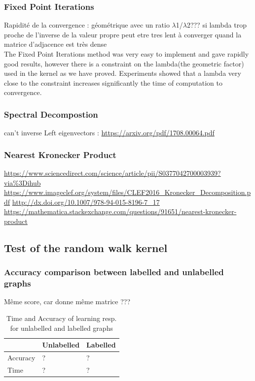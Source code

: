 \documentclass{article}
\theoremstyle{definition}
\begin{document}
\subsubsection{Fixed Point Iterations}
Rapidité de la convergence : géométrique avec un ratio $\lambda$1/$\lambda$2???
si lambda trop proche de l'inverse de la valeur propre peut etre tres lent à converger quand la matrice d'adjacence est très dense\\
The Fixed Point Iterations method was very easy to implement and gave rapidly good results, however there is a constraint on the lambda(the geometric factor) used in the kernel as we have proved. Experiments showed that a lambda very close to the constraint increases significantly the time of computation to convergence.

\subsubsection{Spectral Decompostion}
can't inverse Left eigenvectors : 
\url{https://arxiv.org/pdf/1708.00064.pdf}
\subsubsection{Nearest Kronecker Product}
\url{https://www.sciencedirect.com/science/article/pii/S0377042700003939?via%3Dihub}
	\url{https://www.imageclef.org/system/files/CLEF2016_Kronecker_Decomposition.pdf}
	\url{http://dx.doi.org/10.1007/978-94-015-8196-7_17}
	\url{https://mathematica.stackexchange.com/questions/91651/nearest-kronecker-product}
	

\subsection{Test of the random walk kernel}
\subsubsection{Accuracy comparison between labelled and unlabelled graphs}
Même score, car donne même matrice ???
\begin{table}[!htb]
\begin{center}
\begin{tabular}{|l|l|l|}
    \hline
    & Unlabelled & Labelled \\
    \hline
    Accuracy & ? & ? \\
    \hline
    Time & ? & ? \\
    \hline
\end{tabular}
\end{center}
\caption {Time and Accuracy of learning resp. for unlabelled and labelled graphs} \label{tab:lab_vs_nolab} 
\end{table}
\end{document}
